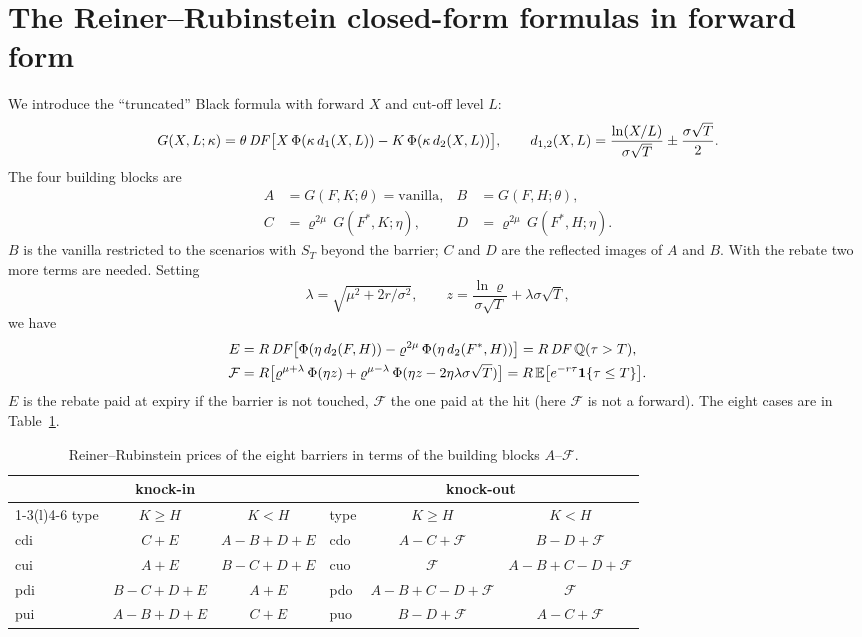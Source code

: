 \section{The Reiner--Rubinstein closed-form formulas in forward form}
We introduce the ``truncated'' Black formula with forward $X$ and cut-off level $L$:
\[
G(X,L;\kappa)=\theta\,\mathit{DF}\big[X\,\Phi(\kappa\,d_1(X,L))-K\,\Phi(\kappa\,d_2(X,L))\big],\qquad
d_{1,2}(X,L)=\frac{\ln(X/L)}{\sigma\sqrt T}\pm\frac{\sigma\sqrt T}2 .
\]
The four building blocks are
\begin{align*}
A&=G(F,K;\theta)=\text{vanilla}, & B&=G(F,H;\theta),\\
C&=\varrho^{2\mu}\,G(F^*,K;\eta), & D&=\varrho^{2\mu}\,G(F^*,H;\eta).
\end{align*}
$B$ is the vanilla restricted to the scenarios with $S_T$ beyond the barrier; $C$ and $D$ are the reflected images of
$A$ and $B$. With the rebate two more terms are needed. Setting
\[
\lambda=\sqrt{\mu^2+2r/\sigma^2},\qquad z=\frac{\ln\varrho}{\sigma\sqrt T}+\lambda\sigma\sqrt T,
\]
we have
\begin{align*}
E&=R\,\mathit{DF}\big[\Phi(\eta\,d_2(F,H))-\varrho^{2\mu}\,\Phi(\eta\,d_2(F^*,H))\big]=R\,\mathit{DF}\,\mathbb{Q}(\tau>T),\\
\mathcal F&=R\big[\varrho^{\mu+\lambda}\,\Phi(\eta z)+\varrho^{\mu-\lambda}\,\Phi(\eta z-2\eta\lambda\sigma\sqrt T)\big]
=R\,\mathbb{E}\big[e^{-r\tau}\mathbf{1}\{\tau\le T\}\big].
\end{align*}
$E$ is the rebate paid at expiry if the barrier is not touched, $\mathcal F$ the one paid at the hit (here
$\mathcal F$ is not a forward). The eight cases are in Table~\ref{tab:rr}.
\begin{table}[htbp]
\centering
\small
\caption{Reiner--Rubinstein prices of the eight barriers in terms of the building blocks $A$--$\mathcal F$.}
\label{tab:rr}
\begin{tabular*}{\textwidth}{@{\extracolsep{\fill}}lcclcc@{}}
\toprule
\multicolumn{3}{c}{knock-in} & \multicolumn{3}{c}{knock-out}\\
\cmidrule(r){1-3}\cmidrule(l){4-6}
type & $K\ge H$ & $K<H$ & type & $K\ge H$ & $K<H$\\
\midrule
cdi & $C+E$ & $A-B+D+E$ & cdo & $A-C+\mathcal F$ & $B-D+\mathcal F$\\
cui & $A+E$ & $B-C+D+E$ & cuo & $\mathcal F$ & $A-B+C-D+\mathcal F$\\
pdi & $B-C+D+E$ & $A+E$ & pdo & $A-B+C-D+\mathcal F$ & $\mathcal F$\\
pui & $A-B+D+E$ & $C+E$ & puo & $B-D+\mathcal F$ & $A-C+\mathcal F$\\
\bottomrule
\end{tabular*}
\end{table}

